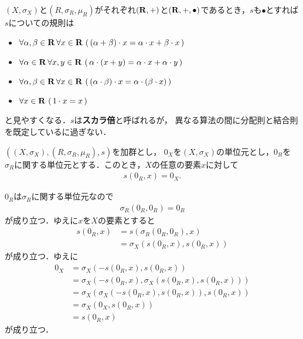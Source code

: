 	$(X,\sigma_X)$と$(R,\sigma_R,\mu_R)$がそれぞれ$(\mathbf{R},+)$と$(\mathbf{R},+,\bullet)$であるとき，$s$も$\bullet$とすれば
	$s$についての規則は
	\begin{itemize}
		\item $\forall \alpha,\beta \in \mathbf{R}\, \forall x \in \mathbf{R}\, \left(\, (\alpha + \beta) \cdot x
			= \alpha \cdot x + \beta \cdot x\, \right)$
		\item $\forall \alpha \in \mathbf{R}\, \forall x,y \in \mathbf{R}\, \left(\, \alpha \cdot (x+y)
			= \alpha \cdot x + \alpha \cdot y\, \right)$
		\item $\forall \alpha,\beta \in \mathbf{R}\, \forall x \in \mathbf{R}\, \left(\, (\alpha \cdot \beta) \cdot x
			= \alpha \cdot (\beta \cdot x)\, \right)$
		\item $\forall x \in \mathbf{R}\, \left(\, 1 \cdot x = x\, \right)$
	\end{itemize}
	と見やすくなる．$s$は{\bf スカラ倍}と呼ばれるが，
	異なる算法の間に分配則と結合則を既定しているに過ぎない．
	
	\begin{screen}
		\begin{thm}[$0$倍すればゼロ]\label{thm:zero_multiplication_is_zero}
			$\left((X,\sigma_X),(R,\sigma_R,\mu_R),s\right)$を加群とし，
			$0_X$を$(X,\sigma_X)$の単位元とし，$0_R$を$\sigma_R$に関する単位元とする．このとき，$X$の任意の要素$x$に対して
			\begin{align}
				s\left(0_R,x\right) = 0_X.
			\end{align}
		\end{thm}
	\end{screen}
	
	\begin{sketch}
		$0_R$は$\sigma_R$に関する単位元なので
		\begin{align}
			\sigma_R\left(0_R,0_R\right) = 0_R
		\end{align}
		が成り立つ．ゆえに$x$を$X$の要素とすると
		\begin{align}
			s\left(0_R,x\right) &= s\left(\sigma_R\left(0_R,0_R\right),x\right) \\
			&= \sigma_X\left(s\left(0_R,x\right),s\left(0_R,x\right)\right)
		\end{align}
		が成り立つ．ゆえに
		\begin{align}
			0_X &= \sigma_X\left(-s\left(0_R,x\right),s\left(0_R,x\right)\right) \\
			&= \sigma_X\left(-s\left(0_R,x\right),\sigma_X\left(s\left(0_R,x\right),s\left(0_R,x\right)\right)\right) \\
			&= \sigma_X\left(\sigma_X\left(-s\left(0_R,x\right),s\left(0_R,x\right)\right),s\left(0_R,x\right)\right) \\
			&= \sigma_X\left(0_X,s\left(0_R,x\right)\right) \\
			&= s\left(0_R,x\right)
		\end{align}
		が成り立つ．
		\QED
	\end{sketch}
	
